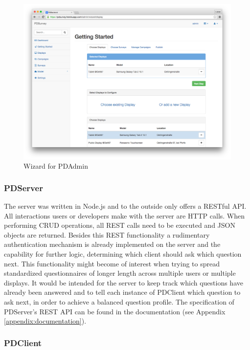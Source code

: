 	\begin{figure}%
	    \begin{center}
	        \includegraphics[width=.7\columnwidth]{img/screenshots/pdadmin/wizard-display_selected.png}
	    \end{center}
	 \caption[PDAdmin Wizard]{Wizard for PDAdmin}
	 \label{fig:pdadmin-wizard}
	\end{figure}




	\subsubsection{PDServer}

		The server was written in Node.js and to the outside only offers a RESTful API. All interactions users or developers make with the server are HTTP calls. When performing CRUD operations, all REST calls need to be executed and JSON objects are returned.
		Besides this REST functionality a rudimentary authentication mechanism is already implemented on the server and the capability for further logic, determining which client should ask which question next. This functionality might become of interest when trying to spread standardized questionnaires of longer length across multiple users or multiple displays. It would be intended for the server to keep track which questions have already been answered and to tell each instance of PDClient which question to ask next, in order to achieve a balanced question profile.
		The specification of PDServer's REST API can be found in the documentation (see Appendix \ref{appendix:documentation}).



	\subsubsection{PDClient}

